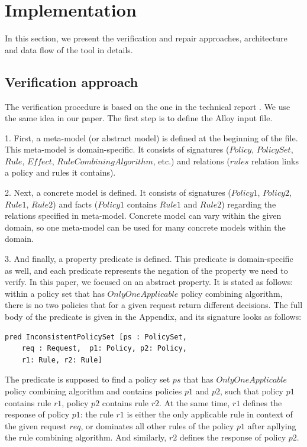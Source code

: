 \documentclass{acm_proc_article-sp}
\begin{document}
\section{Implementation}

In this section, we present the verification and repair approaches, architecture and data flow of the tool in details.

\subsection{Verification approach}

The verification procedure is based on the one in the technical report \cite{acp:alloy}. We use the same idea in our paper.
The first step is to define the Alloy input file.

1. First, a meta-model (or abstract model) is defined at the beginning of the file. This meta-model is domain-specific. It consists of signatures ($Policy$, $PolicySet$, $Rule$, $Effect$, $RuleCombiningAlgorithm$, etc.) and relations ($rules$ relation links a policy and rules it contains).

2. Next, a concrete model is defined. It consists of signatures ($Policy1$, $Policy2$, $Rule1$, $Rule2$) and facts ($Policy1$ contains $Rule1$ and $Rule2$) regarding the relations specified in meta-model. Concrete model can vary within the given domain, so one meta-model can be used for many concrete models within the domain.

3. And finally, a property predicate is defined. This predicate is domain-specific as well, and each predicate represents the negation of the property we need to verify. In this paper, we focused on an abstract property. It is stated as follows: within a policy set that has $OnlyOneApplicable$ policy combining algorithm, there is no two policies that for a given request return different decisions. The full body of the predicate is given in the Appendix, and its signature looks as follows:

\begin{verbatim}
pred InconsistentPolicySet [ps : PolicySet, 
    req : Request,  p1: Policy, p2: Policy, 
    r1: Rule, r2: Rule]
\end{verbatim}

The predicate is supposed to find a policy set $ps$ that has $OnlyOneApplicable$ policy combining algorithm and contains policies $p1$ and $p2$, such that policy $p1$ contains rule $r1$, policy $p2$ contains rule $r2$. At the same time, $r1$ defines the response of policy $p1$: the rule $ r1$ is either the only applicable rule in context of the given request $req$, or dominates all other rules of the policy $p1$ after apllying the rule combining algorithm. And similarly, $r2$ defines the response of policy $p2$.
\end{document}
